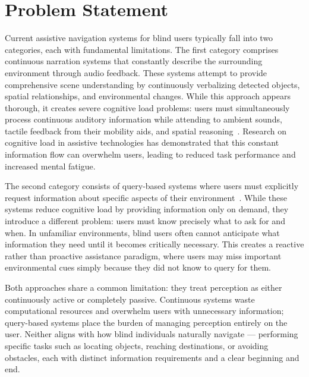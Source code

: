 \section{Problem Statement}
\label{sec:problem_statement}

Current assistive navigation systems for blind users typically fall into two
categories, each with fundamental limitations. The first category comprises
continuous narration systems that constantly describe the surrounding environment
through audio feedback. These systems attempt to provide comprehensive scene
understanding by continuously verbalizing detected objects, spatial relationships,
and environmental changes. While this approach appears thorough, it creates severe
cognitive load problems: users must simultaneously process continuous auditory
information while attending to ambient sounds, tactile feedback from their mobility
aids, and spatial reasoning~\cite{hossain2010cognitive}. Research on cognitive load
in assistive technologies has demonstrated that this constant information flow can
overwhelm users, leading to reduced task performance and increased mental fatigue.

The second category consists of query-based systems where users must explicitly
request information about specific aspects of their
environment~\cite{li2018vision, khan2020insight}. While these systems reduce
cognitive load by providing information only on demand, they introduce a different
problem: users must know precisely what to ask for and when. In unfamiliar
environments, blind users often cannot anticipate what information they need until it
becomes critically necessary. This creates a reactive rather than proactive
assistance paradigm, where users may miss important environmental cues simply because
they did not know to query for them.

Both approaches share a common limitation: they treat perception as either
continuously active or completely passive. Continuous systems waste computational
resources and overwhelm users with unnecessary information; query-based systems place
the burden of managing perception entirely on the user. Neither aligns with how blind
individuals naturally navigate --- performing specific tasks such as locating
objects, reaching destinations, or avoiding obstacles, each with distinct information
requirements and a clear beginning and end.

